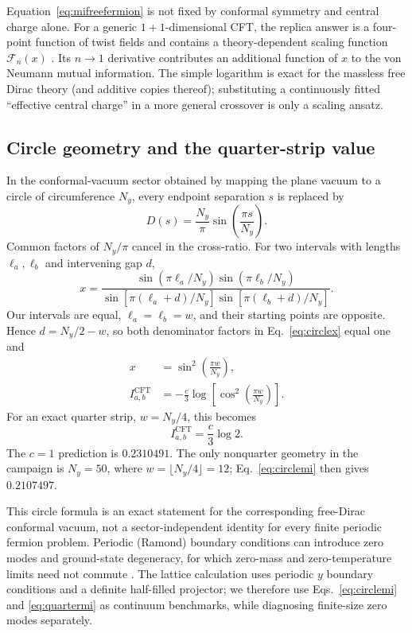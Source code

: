 \documentclass[aps,prb,twocolumn,nofootinbib,superscriptaddress,floatfix]{revtex4-2}
\newcommand{\Iab}{I_{a,b}}
\begin{document}
Equation~\eqref{eq:mifreefermion} is not fixed by conformal symmetry and
central charge alone.  For a generic $1+1$-dimensional CFT, the replica answer
is a four-point function of twist fields and contains a theory-dependent
scaling function $\mathcal F_n(x)$ \cite{CalabreseCardyTonni2009}.  Its
$n\rightarrow1$ derivative contributes an additional function of $x$ to the
von Neumann mutual information.  The simple logarithm is exact for the
massless free Dirac theory (and additive copies thereof); substituting a
continuously fitted ``effective central charge'' in a more general crossover
is only a scaling ansatz.

\subsection{Circle geometry and the quarter-strip value}

In the conformal-vacuum sector obtained by mapping the plane vacuum to a
circle of circumference $N_y$, every endpoint separation $s$ is replaced by
\begin{equation}
 D(s)=\frac{N_y}{\pi}\sin\left(\frac{\pi s}{N_y}\right).
 \label{eq:chord}
\end{equation}
Common factors of $N_y/\pi$ cancel in the cross-ratio.  For two intervals with
lengths $\ell_a,\ell_b$ and intervening gap $d$,
\begin{equation}
 x=\frac{
 \sin(\pi\ell_a/N_y)\sin(\pi\ell_b/N_y)}{
 \sin[\pi(\ell_a+d)/N_y]
 \sin[\pi(\ell_b+d)/N_y]}.
 \label{eq:circlex}
\end{equation}
Our intervals are equal, $\ell_a=\ell_b=w$, and their starting points are
opposite.  Hence $d=N_y/2-w$, so both denominator factors in
Eq.~\eqref{eq:circlex} equal one and
\begin{align}
 x&=\sin^2\left(\frac{\pi w}{N_y}\right),
 \\
 \Iab^{\mathrm{CFT}}
 &=-\frac{c}{3}\log\left[
 \cos^2\left(\frac{\pi w}{N_y}\right)\right].
 \label{eq:circlemi}
\end{align}
For an exact quarter strip, $w=N_y/4$, this becomes
\begin{equation}
 \boxed{\Iab^{\mathrm{CFT}}=\frac{c}{3}\log 2}.
 \label{eq:quartermi}
\end{equation}
The $c=1$ prediction is $0.2310491$.  The only nonquarter geometry in the
campaign is $N_y=50$, where $w=\lfloor N_y/4\rfloor=12$; Eq.~\eqref{eq:circlemi}
then gives $0.2107497$.

This circle formula is an exact statement for the corresponding free-Dirac
conformal vacuum, not a sector-independent identity for every finite periodic
fermion problem.  Periodic (Ramond) boundary conditions can introduce zero
modes and ground-state degeneracy, for which zero-mass and zero-temperature
limits need not commute \cite{HerzogNishioka2013}.  The lattice calculation
uses periodic $y$ boundary conditions and a definite half-filled projector;
we therefore use Eqs.~\eqref{eq:circlemi} and \eqref{eq:quartermi} as continuum
benchmarks, while diagnosing finite-size zero modes separately.
\end{document}
